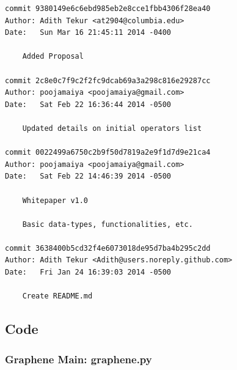 \documentclass[a4paper]{article}
\begin{document}
\begin{verbatim}
commit 9380149e6c6ebd985eb2e8cce1fbb4306f28ea40
Author: Adith Tekur <at2904@columbia.edu>
Date:   Sun Mar 16 21:45:11 2014 -0400

    Added Proposal

commit 2c8e0c7f9c2f2fc9dcab69a3a298c816e29287cc
Author: poojamaiya <poojamaiya@gmail.com>
Date:   Sat Feb 22 16:36:44 2014 -0500

    Updated details on initial operators list

commit 0022499a6750c2b9f50d7819a2e9f1d7d9e21ca4
Author: poojamaiya <poojamaiya@gmail.com>
Date:   Sat Feb 22 14:46:39 2014 -0500

    Whitepaper v1.0
    
    Basic data-types, functionalities, etc.

commit 3638400b5cd32f4e6073018de95d7ba4b295c2dd
Author: Adith Tekur <Adith@users.noreply.github.com>
Date:   Fri Jan 24 16:39:03 2014 -0500

    Create README.md

\end{verbatim}
\subsection{Code}
\subsubsection{Graphene Main: graphene.py}
 
\end{document}
